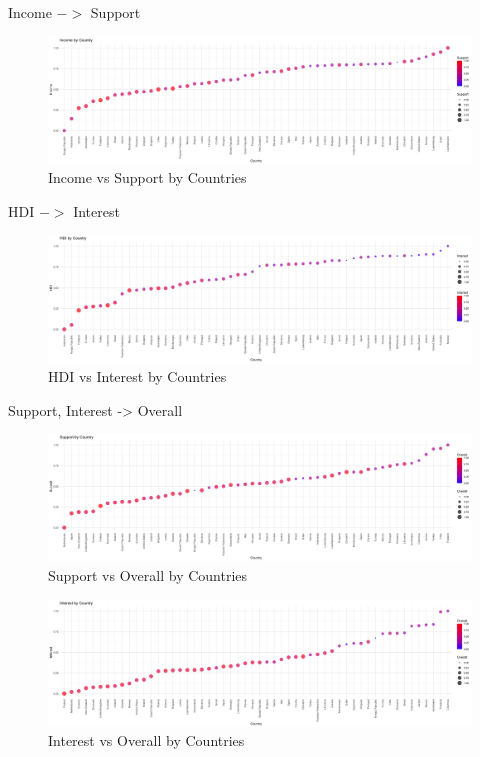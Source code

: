 \documentclass[12pt]{article}
\begin{document}

Income $->$ Support
\begin{figure}[htb]
  \centering
  \includegraphics[width=\linewidth]{images/income_support_by_country}
  \caption{Income vs Support by Countries}
  \label{fig:inc_sup}
\end{figure}

HDI $->$ Interest
\begin{figure}[htb]
  \centering
  \includegraphics[width=\linewidth]{images/hdi_interest_by_country}
  \caption{HDI vs Interest by Countries}
  \label{fig:hdi_int}
\end{figure}

Support, Interest -> Overall

\begin{figure}[htb]
  \centering
  \includegraphics[width=\linewidth]{images/overall_support_by_country}
  \caption{Support vs Overall by Countries}
  \label{fig:sup_overall}
\end{figure}

\begin{figure}[htb]
  \centering
  \includegraphics[width=\linewidth]{images/overall_interest_by_country}
  \caption{Interest vs Overall by Countries}
  \label{fig:int_overall}
\end{figure}
\end{document}
